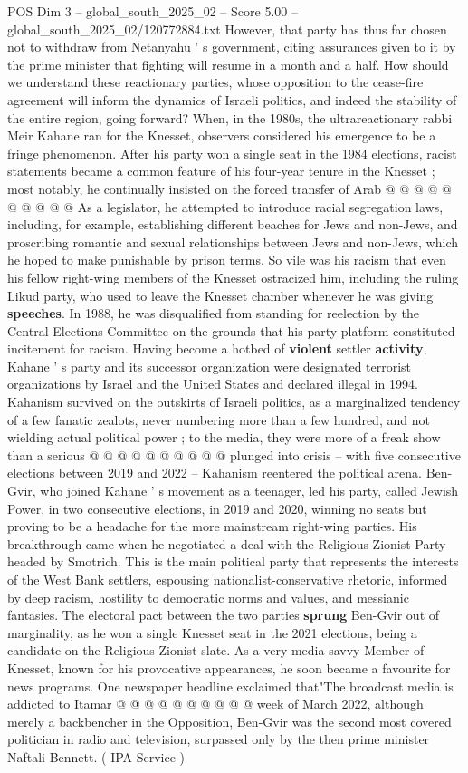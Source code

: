 \begin{textsample}{POS Dim 3 – global\_south\_2025\_02 – Score 5.00 – global\_south\_2025\_02/120772884.txt}
However, that party has thus far chosen not to withdraw from Netanyahu ' s government, citing assurances given to it by the prime minister that fighting will resume in a month and a half.
How should we understand these reactionary parties, whose opposition to the cease-fire agreement will inform the dynamics of Israeli politics, and indeed the stability of the entire region, going forward?
When, in the 1980s, the ultrareactionary rabbi Meir Kahane ran for the Knesset, observers considered his emergence to be a fringe phenomenon.
After his party won a single seat in the 1984 elections, racist statements became a common feature of his four-year tenure in the Knesset ; most notably, he continually insisted on the forced transfer of Arab @ @ @ @ @ @ @ @ @ @ As a legislator, he attempted to introduce racial segregation laws, including, for example, establishing different beaches for Jews and non-Jews, and proscribing romantic and sexual relationships between Jews and non-Jews, which he hoped to make punishable by prison terms.
So vile was his racism that even his fellow right-wing members of the Knesset ostracized him, including the ruling Likud party, who used to leave the Knesset chamber whenever he was giving \textbf{speeches}.
In 1988, he was disqualified from standing for reelection by the Central Elections Committee on the grounds that his party platform constituted incitement for racism.
Having become a hotbed of \textbf{violent} settler \textbf{activity}, Kahane ' s party and its successor organization were designated terrorist organizations by Israel and the United States and declared illegal in 1994.
Kahanism survived on the outskirts of Israeli politics, as a marginalized tendency of a few fanatic zealots, never numbering more than a few hundred, and not wielding actual political power ; to the media, they were more of a freak show than a serious @ @ @ @ @ @ @ @ @ @ plunged into crisis -- with five consecutive elections between 2019 and 2022 -- Kahanism reentered the political arena.
Ben-Gvir, who joined Kahane ' s movement as a teenager, led his party, called Jewish Power, in two consecutive elections, in 2019 and 2020, winning no seats but proving to be a headache for the more mainstream right-wing parties.
His breakthrough came when he negotiated a deal with the Religious Zionist Party headed by Smotrich.
This is the main political party that represents the interests of the West Bank settlers, espousing nationalist-conservative rhetoric, informed by deep racism, hostility to democratic norms and values, and messianic fantasies.
The electoral pact between the two parties \textbf{sprung} Ben-Gvir out of marginality, as he won a single Knesset seat in the 2021 elections, being a candidate on the Religious Zionist slate.
As a very media savvy Member of Knesset, known for his provocative appearances, he soon became a favourite for news programs.
One newspaper headline exclaimed that"The broadcast media is addicted to Itamar @ @ @ @ @ @ @ @ @ @ week of March 2022, although merely a backbencher in the Opposition, Ben-Gvir was the second most covered politician in radio and television, surpassed only by the then prime minister Naftali Bennett. ( IPA Service )


\end{textsample}

